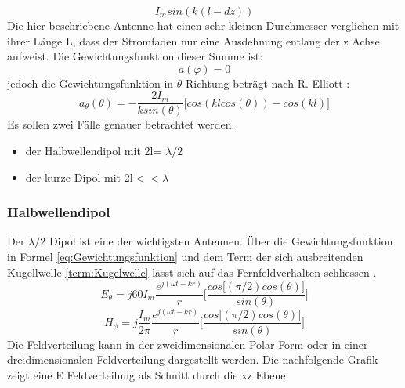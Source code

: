 \begin{equation}
I_{m}sin(k(l-dz))
\end{equation}
Die hier beschriebene Antenne hat einen sehr kleinen Durchmesser verglichen mit ihrer Länge L, dass der Stromfaden nur eine Ausdehnung entlang der z Achse aufweist. Die Gewichtungsfunktion dieser Summe ist:
\begin{equation}
a(\varphi)= 0
\end{equation}
jedoch die Gewichtungsfunktion in $\theta$ Richtung beträgt nach R. Elliott \cite{elliott1981antenna}:
\begin{equation}\label{eq:Gewichtungsfunktion}
a_{\theta}(\theta)=- \frac{2I_{m}}{k sin(\theta)} \lbrack cos(kl cos(\theta)) - cos(kl) \rbrack
\end{equation}
Es sollen zwei Fälle genauer betrachtet werden.
\begin{itemize}
\item der Halbwellendipol mit 2l= $\lambda/2$
\item der kurze Dipol mit 2l$<<\lambda$
\end{itemize}
\subsubsection{Halbwellendipol}
Der $\lambda/2$ Dipol ist eine der wichtigsten Antennen. Über die Gewichtungsfunktion in Formel \ref{eq:Gewichtungsfunktion} und dem Term der sich ausbreitenden Kugellwelle \ref{term:Kugelwelle} lässt sich auf das Fernfeldverhalten schliessen \cite{elliott1981antenna}.
\begin{equation}
E_{\theta}=j60I_{m} \frac{e^{j(\omega t - kr)}}{r} \lbrack \frac{cos\lbrack  (\pi/2) cos(\theta)\rbrack}{sin(\theta)} \rbrack
\end{equation}
\begin{equation}
H_{\phi}=j \frac{I_{m}}{2\pi} \frac{e^{j(\omega t - kr)}}{r} \lbrack \frac{cos\lbrack  (\pi/2) cos(\theta)\rbrack}{sin(\theta)} \rbrack
\end{equation}
Die Feldverteilung kann in der  zweidimensionalen Polar Form oder in einer dreidimensionalen Feldverteilung dargestellt werden.
Die nachfolgende Grafik zeigt eine E Feldverteilung als Schnitt durch die xz Ebene.\\



